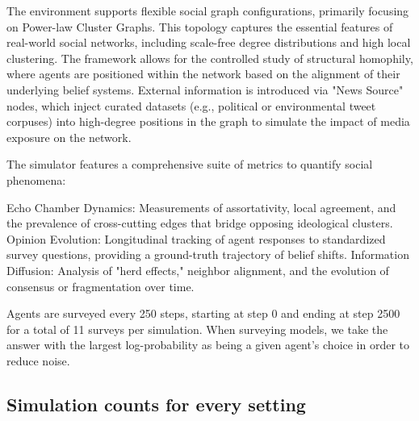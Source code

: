 \documentclass{article} %
\begin{document}
The environment supports flexible social graph configurations, primarily focusing on Power-law Cluster Graphs. This topology captures the essential features of real-world social networks, including scale-free degree distributions and high local clustering. The framework allows for the controlled study of structural homophily, where agents are positioned within the network based on the alignment of their underlying belief systems. External information is introduced via "News Source" nodes, which inject curated datasets (e.g., political or environmental tweet corpuses) into high-degree positions in the graph to simulate the impact of media exposure on the network.

The simulator features a comprehensive suite of metrics to quantify social phenomena:

Echo Chamber Dynamics: Measurements of assortativity, local agreement, and the prevalence of cross-cutting edges that bridge opposing ideological clusters.
Opinion Evolution: Longitudinal tracking of agent responses to standardized survey questions, providing a ground-truth trajectory of belief shifts.
Information Diffusion: Analysis of "herd effects," neighbor alignment, and the evolution of consensus or fragmentation over time.

Agents are surveyed every 250 steps, starting at step 0 and ending at step 2500 for a total of 11 surveys per simulation. When surveying models, we take the answer with the largest log-probability as being a given agent's choice in order to reduce noise.

\subsection{Simulation counts for every setting}
\label{appendix_sim_counts}
\end{document}
